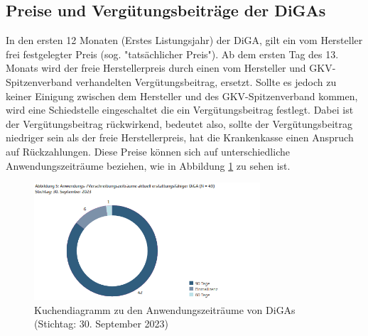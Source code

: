 \documentclass{article}
\begin{document}
		\subsection{Preise und Vergütungsbeiträge der DiGAs}  
			In den ersten 12 Monaten (Erstes Listungsjahr) der DiGA, gilt ein vom Hersteller frei festgelegter Preis (sog. "tatsächlicher Preis"). Ab dem ersten Tag des 13. Monats wird der freie Herstellerpreis durch einen vom Hersteller und GKV-Spitzenverband verhandelten Vergütungsbeitrag, ersetzt. Sollte es jedoch zu keiner Einigung zwischen dem Hersteller und des GKV-Spitzenverband kommen, wird eine Schiedstelle eingeschaltet die ein Vergütungsbeitrag festlegt. Dabei ist der Vergütungsbeitrag rückwirkend, bedeutet also, sollte der Vergütungsbeitrag niedriger sein als der freie Herstellerpreis, hat die Krankenkasse einen Anspruch auf Rückzahlungen\cite[vgl. S. 11]{TK-Report-2}. Diese Preise können sich auf unterschiedliche Anwendungszeiträume beziehen, wie in Abbildung \ref{Abb-andwendungszeiträume-diga} zu sehen ist. 
			\begin{figure}[hbtp]
				\centering
				\includegraphics[width=0.75\textwidth]{./grafiken/anwendungszeitraume_diga}
				\caption[Anwendungszeiträume von DiGAs]{Kuchendiagramm zu den Anwendungszeiträume von DiGAs (Stichtag: 30. September 2023)}
				\label{Abb-andwendungszeiträume-diga}
			\end{figure}
\end{document}
